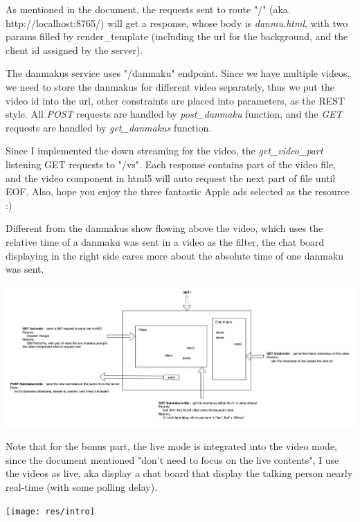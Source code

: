 \documentclass[onecolumn, oneside, ctexart]{SUSTechHomework}
\begin{document}
\par As mentioned in the document, the requests sent to route "/" (aka. http://localhost:8765/) will get a response, whose body is \textit{danmu.html}, with two params filled by render\_template (including the url for the background, and the client id assigned by the server).
\par The danmakus service uses "/danmaku" endpoint. Since we have multiple videos, we need to store the danmakus for different video separately, thus we put the video id into the url, other constraints are placed into parameters, as the REST style. All \emph{POST} requests are handled by \emph{post\_danmaku} function, and the \emph{GET} requests are handled by \emph{get\_danmakus} function.
\par Since I implemented the down streaming for the video, the \emph{get\_video\_part} listening GET requests to "/vs". Each response contains part of the video file, and the video component in html5 will auto request the next part of file until EOF. Also, hope you enjoy the three fantastic Apple ads selected as the resource :)
\par Different from the danmakus show flowing above the video, which uses the relative time of a danmaku was sent in a video as the filter, the chat board displaying in the right side cares more about the absolute time of one danmaku was sent.\\

\centerline{\includegraphics[width=\textwidth]{res/http}}

\par Note that for the bonus part, the live mode is integrated into the video mode, since the document mentioned "don't need to focus on the live contents", I use the videos as live, aka display a chat board that display the talking person nearly real-time (with some polling delay).\\

\centerline{\texttt{[image: res/intro]}}
\end{document}
